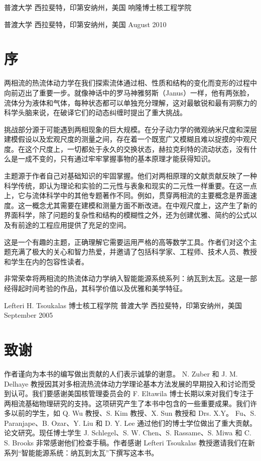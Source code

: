 \documentclass[11pt,a4paper,openany,fontset=none]{ctexbook}
\begin{document}
普渡大学 西拉斐特，印第安纳州，美国
响隆博士核工程学院

普渡大学 西拉斐特，印第安纳州，美国
August 2010

\chapter*{序}
两相流的热流体动力学在我们探索流体通过相、性质和结构的变化而变形的过程中向前迈出了重要一步。就像神话中的罗马神雅努斯（Janus）一样，他有两张脸，流体分为液体和气体，每种状态都可以单独充分理解，这对最敏锐和最有洞察力的科学头脑来说，在破译它们的动态纠缠时提出了重大挑战。

挑战部分源于可能遇到两相现象的巨大规模。在分子动力学的微观纳米尺度和深层建模假设以及宏观尺度的测量之间，存在着一个既宽广又模糊且难以捉摸的中观尺度。在这个尺度上，一切都处于永久的交换状态，赫拉克利特的流动状态，没有什么是一成不变的，只有通过牢牢掌握事物的基本原理才能获得知识。

主题源于作者自己对基础知识的牢固掌握。他们对两相原理的文献贡献反映了一种科学传统，即认为理论和实验的二元性与表象和现实的二元性一样重要。在这一点上，它与流体科学中的其他专题著作不同。例如，贯穿两相流的主要概念是界面速度。这一概念尤其需要在建模和测量方面不断改进。在中观尺度上，这产生了新的界面科学，除了问题的复杂性和结构的模糊性之外，还为创建优雅、简约的公式以及有前途的工程应用提供了充足的空间。

这是一个有趣的主题，正确理解它需要运用严格的高等数学工具。作者们对这个主题充满了极大的关心和智力热爱，并邀请了包括科学家、工程师、技术人员、教授和学生在内的包容性读者。

非常荣幸将两相流的热流体动力学纳入智能能源系统系列：纳瓦到太瓦。这是一部经得起时间考验的作品，其科学价值以及优雅和美学特征。

Lefteri H. Tsoukalas 博士核工程学院
普渡大学 西拉斐特，印第安纳州，美国
September 2005

\chapter*{致谢}
作者谨向为本书的编写做出贡献的人们表示诚挚的谢意。 N. Zuber 和 J. M. Delhaye 教授因其对多相流热流体动力学理论基本方法发展的早期投入和讨论而受到认可。我们要感谢美国核管理委员会的 F. Eltawila 博士长期以来对我们专注于两相流基础物理研究的支持。这项研究产生了本书中包含的一些重要成果。我们许多以前的学生，如 Q. Wu 教授、S. Kim 教授、X. Sun 教授和 Drs. X.Y。 Fu、S. Paranjape、B. Ozar、Y. Liu 和 D. Y. Lee 通过他们的博士学位做出了重大贡献。论文研究。现任博士学生 J. Schlegel、S. W. Chen、S. Rassame、S. Miwa 和​​ C. S. Brooks 非常感谢他们检查手稿。作者感谢 Lefteri Tsoukalas 教授邀请我们在新系列“智能能源系统：纳瓦到太瓦”下撰写这本书。
\end{document}
